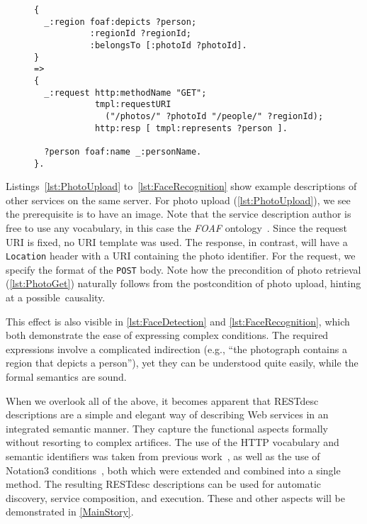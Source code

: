 \documentclass[runningheads,a4paper, twocolumn]{llncs}
\begin{document}
\begin{figure}[float=t!]
\begin{lstlisting}[caption=RESTdesc description of face recognition,
                   label=lst:FaceRecognition, escapechar=§, belowcaptionskip=0em]
{
  _:region foaf:depicts ?person;
           :regionId ?regionId;
           :belongsTo [:photoId ?photoId].
}
=>
{
  _:request http:methodName "GET";
            tmpl:requestURI
              ("/photos/" ?photoId "/people/" ?regionId);
            http:resp [ tmpl:represents ?person ].
  
  ?person foaf:name _:personName.
}.
\end{lstlisting}
\end{figure}

Listings~\ref{lst:PhotoUpload} to~\ref{lst:FaceRecognition} show example descriptions of other services on the same server. For photo upload (\autoref{lst:PhotoUpload}), we see the prerequisite is to have an image. Note that the service description author is free to use any vocabulary, in this case the \emph{FOAF} ontology~\cite{FOAF}. Since the request URI is fixed, no URI template was used. The response, in contrast, will have a \Verb!Location! header with a URI containing the photo identifier. For the request, we specify the format of the \Verb!POST! body. Note how the precondition of photo retrieval (\autoref{lst:PhotoGet}) naturally follows from the postcondition of photo upload, hinting at a possible~causality.

This effect is also visible in \autoref{lst:FaceDetection} and \autoref{lst:FaceRecognition}, which both demonstrate the ease of expressing complex conditions. The required expressions involve a complicated indirection (e.g., ``the photograph contains a region that depicts a person''), yet they can be understood quite easily, while the formal semantics are sound.

When we overlook all of the above, it becomes apparent that RESTdesc descriptions are a simple and elegant way of describing Web services in an integrated semantic manner. They capture the functional aspects formally without resorting to complex artifices. The use of the HTTP vocabulary and semantic identifiers was taken from previous work~\cite{Steiner:2011p5006}, as well as the use of \mbox{Notation3} conditions~\cite{Verborgh:2010p2746}, both which were extended and combined into a single method. The resulting \mbox{RESTdesc} descriptions can be used for automatic discovery, service composition, and execution. These and other aspects will be demonstrated in \autoref{MainStory}.
\end{document}
